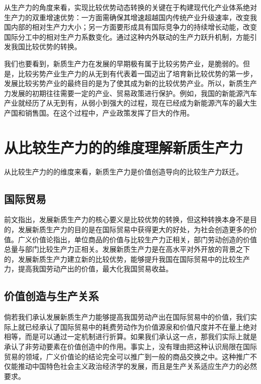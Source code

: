 从生产力的角度来看，实现比较优势动态转换的关键在于构建现代化产业体系绝对生产力的双重增速优势：一方面需确保其增速超越国内传统产业升级速率，改变我国内部的相对生产力大小；另一方面要形成具有国际竞争力的持续增长动能，改变国际分工中的相对生产力系数变化。通过这种内外联动的生产力跃升机制，方能引发我国比较优势的转换。

我们也要看到，新质生产力在发展的早期极有属于比较劣势产业，是脆弱的。但是，比较劣势产业生产力的从无到有代表着一国迈出了培育新比较优势的第一步\cite[70]{LiuLeYiJingTaiBiJiaoYouShiDongTaiHuaDeQuDongLiYuLiShiJingYanJianLunFaZhanXinZhiShengChanLiYuTiShengChanYeLianGongYingLianRenXingNeiYin2025}，发展比较劣势产业的最终目的是为了使其成为新的比较优势产业。所以，新质生产力发展的初期往往需要一定的产业、贸易政策进行保护。例如，我国的新能源汽车产业就经历了从无到有，从弱小到强大的过程，现在已经成为新能源汽车的最大生产国和销售国。在这个过程中，产业政策发挥了巨大的作用。\cite{WangMingHeWoGuoXinNengYuanQiCheChanYeZhengCeYanJiu2023}

\section{从比较生产力的的维度理解新质生产力}

从比较生产力的的维度来看，新质生产力是价值创造导向的比较生产力跃迁。

\subsection{国际贸易}

前文指出，发展新质生产力的核心要义是比较优势的转换，但这种转换本身不是目的，发展新质生产力的目的是在国际贸易中获得更大的好处，为社会创造更多的价值。广义价值论指出，单位商品的价值与比较生产力正相关，部门劳动创造的价值总量与部门比较生产力正相关。发展新质生产力是在高水平对外开放的背景之下的\cite[518]{XiJinPingXiJinPingJingJiWenXuanDiYiJuan2025}，发展新质生产力建立新的比较优势，能够提升我国在国际贸易中的比较生产力，提高我国劳动产出的价值，最大化我国贸易收益\cite[76]{LiuLeYiJingTaiBiJiaoYouShiDongTaiHuaDeQuDongLiYuLiShiJingYanJianLunFaZhanXinZhiShengChanLiYuTiShengChanYeLianGongYingLianRenXingNeiYin2025}。

\subsection{价值创造与生产关系}

倘若我们承认发展新质生产力能够提高我国劳动产出在国际贸易中的价值，我们实际上就已经承认了国际贸易中的耗费劳动作为价值源泉和价值尺度并不在量上绝对相等，而是可以通过一定机制进行折算。如果我们承认这一点，那我们实际上就是承认了非劳动要素在价值创造中的作用。事实上，没有理由把这种认识局限在国际贸易的领域，广义价值论的结论完全可以推广到一般的商品交换之中。这种推广不仅能推动中国特色社会主义政治经济学的发展，而且是生产关系适应生产力的必然要求。


